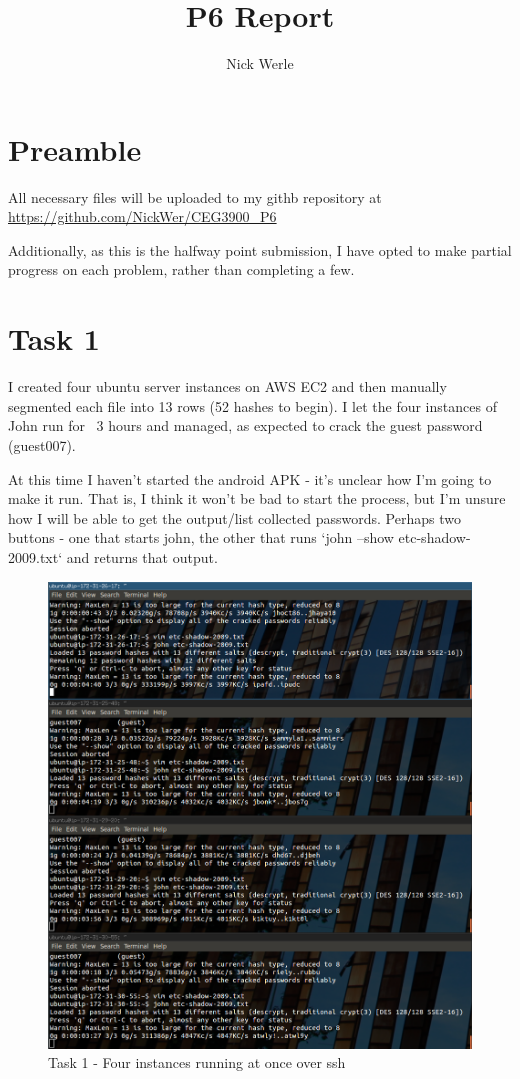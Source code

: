 \documentclass{article}
\title{P6 Report}
\author{Nick Werle}
\begin{document}
\maketitle
\section{Preamble}
All necessary files will be uploaded to my githb repository at \url{https://github.com/NickWer/CEG3900_P6}

Additionally, as this is the halfway point submission, I have opted to make partial progress on each problem, rather than completing a few.
\section{Task 1}
I created four ubuntu server instances on AWS EC2 and then manually segmented each file into 13 rows (52 hashes to begin).
I let the four instances of John run for ~3 hours and managed, as expected to crack the guest password (guest007).

At this time I haven't started the android APK - it's unclear how I'm going to make it run.
That is, I think it won't be bad to start the process, but I'm unsure how I will be able to get the output/list collected passwords.
Perhaps two buttons - one that starts john, the other that runs `john --show etc-shadow-2009.txt` and returns that output.

	\begin{figure}[ht]
        \centerline{
            \includegraphics[width=7.5in]{img/t1s1.png}
        }
		\centering
		\caption{Task 1 - Four instances running at once over ssh}
	\end{figure}
\end{document}
